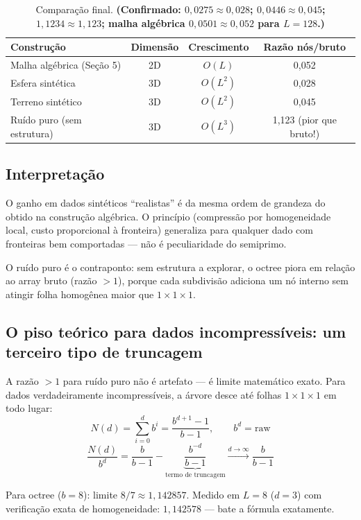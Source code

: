 \documentclass[11pt,a4paper]{article}
\begin{document}
\begin{table}[h]
\centering
\begin{tabular}{lccc}
\toprule
Construção & Dimensão & Crescimento & Razão nós/bruto \\
\midrule
Malha algébrica (Seção 5) & 2D & $O(L)$   & 0,052 \\
Esfera sintética          & 3D & $O(L^2)$ & 0,028 \\
Terreno sintético         & 3D & $O(L^2)$ & 0,045 \\
Ruído puro (sem estrutura)& 3D & $O(L^3)$ & 1,123 (pior que bruto!) \\
\bottomrule
\end{tabular}
\caption{Comparação final. \textbf{(Confirmado: $0{,}0275\approx0{,}028$; $0{,}0446\approx0{,}045$; $1{,}1234\approx1{,}123$; malha algébrica $0{,}0501\approx0{,}052$ para $L=128$.)}}
\end{table}

\subsection{Interpretação}

O ganho em dados sintéticos ``realistas'' é da mesma ordem de grandeza do obtido na construção algébrica. O princípio (compressão por homogeneidade local, custo proporcional à fronteira) generaliza para qualquer dado com fronteiras bem comportadas --- não é peculiaridade do semiprimo.

O ruído puro é o contraponto: sem estrutura a explorar, o octree piora em relação ao array bruto (razão $>1$), porque cada subdivisão adiciona um nó interno sem atingir folha homogênea maior que $1\times1\times1$.

\subsection{O piso teórico para dados incompressíveis: um terceiro tipo de truncagem}

A razão $>1$ para ruído puro não é artefato --- é limite matemático exato. Para dados verdadeiramente incompressíveis, a árvore desce até folhas $1\times1\times1$ em todo lugar:
\[
N(d) = \sum_{i=0}^{d} b^i = \frac{b^{d+1}-1}{b-1}, \qquad b^d = \text{raw}
\]
\[
\frac{N(d)}{b^d} = \frac{b}{b-1} - \underbrace{\frac{b^{-d}}{b-1}}_{\text{termo de truncagem}} \xrightarrow{d\to\infty} \frac{b}{b-1}
\]

Para octree ($b=8$): limite $8/7 \approx 1{,}142857$. Medido em $L=8$ ($d=3$) com verificação exata de homogeneidade: $1{,}142578$ --- bate a fórmula exatamente.
\end{document}
